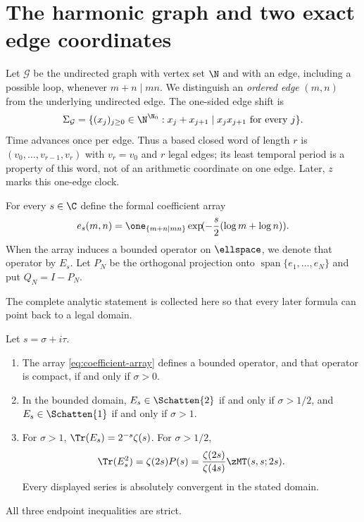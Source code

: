 \section{The harmonic graph and two exact edge coordinates}
\label{sec:graph-coordinates}

Let $\mathcal G$ be the undirected graph with vertex set $\N$ and with an
edge, including a possible loop, whenever $m+n\mid mn$.  We distinguish an
\emph{ordered edge} $(m,n)$ from the underlying undirected edge.  The
one-sided edge shift is
\[
  \Sigma_{\mathcal G}
  =\{(x_j)_{j\geq0}\in\N^{\N_0}:x_j+x_{j+1}\mid x_jx_{j+1}
      \text{ for every }j\}.
\]
Time advances once per edge.  Thus a based closed word of length $r$ is
$(v_0,\ldots,v_{r-1},v_r)$ with $v_r=v_0$ and $r$ legal edges; its least
temporal period is a property of this word, not of an arithmetic coordinate
on one edge.  Later, $z$ marks this one-edge clock.

For every $s\in\C$ define the formal coefficient array
\begin{equation}
 e_s(m,n)=\one_{\{m+n\mid mn\}}
 \exp\!(-\frac{s}{2}(\log m+\log n)).
 \label{eq:coefficient-array}
\end{equation}
When the array induces a bounded operator on $\ellspace$, we denote that
operator by $E_s$.  Let $P_N$ be the orthogonal projection onto
$\operatorname{span}\{e_1,\ldots,e_N\}$ and put $Q_N=I-P_N$.

The complete analytic statement is collected here so that every later
formula can point back to a legal domain.

\begin{theorem}
\label{thm:main}
Let $s=\sigma+i\tau$.
\begin{enumerate}[label=\textup{(\roman*)}]
  \item The array \eqref{eq:coefficient-array} defines a bounded operator,
  and that operator is compact, if and only if $\sigma>0$.
  \item In the bounded domain, $E_s\in\Schatten{2}$ if and only if
  $\sigma>1/2$, and $E_s\in\Schatten{1}$ if and only if $\sigma>1$.
  \item For $\sigma>1$,
  $\Tr(E_s)=2^{-s}\zeta(s)$.
  For $\sigma>1/2$,
  \[
    \Tr(E_s^2)=\zeta(2s)P(s)
      =\frac{\zeta(2s)}{\zeta(4s)}\zMT(s,s;2s).
  \]
  Every displayed series is absolutely convergent in the stated domain.
\end{enumerate}
All three endpoint inequalities are strict.
\end{theorem}

